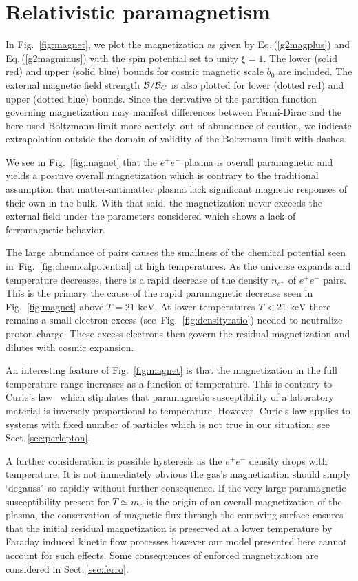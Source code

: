 \documentclass[aps,prd,floatfix,reprint]{revtex4-2}
\newcommand*{\keV}{\text{ keV}}
\newcommand{\req}[1]{Eq.\,(\ref{#1})}
\newcommand{\rf}[1]{Fig.~{\ref{#1}}}
\newcommand{\rsec}[1]{Sect.\,{\ref{#1}}}
\begin{document}
\section{Relativistic paramagnetism}
\label{sec:paramagnetism}
\noindent In \rf{fig:magnet}, we plot the magnetization as given by \req{g2magplus} and \req{g2magminus} with the spin potential set to unity $\xi=1$. The lower (solid red) and upper (solid blue) bounds for cosmic magnetic scale $b_{0}$ are included. The external magnetic field strength ${\cal B}/{\cal B}_{C}$ is also plotted for lower (dotted red) and upper (dotted blue) bounds. Since the derivative of the partition function governing magnetization may manifest differences between Fermi-Dirac and the here used Boltzmann limit more acutely, out of abundance of caution, we indicate extrapolation outside the domain of validity of the Boltzmann limit with dashes.

We see in \rf{fig:magnet} that the $e^{+}e^{-}$ plasma is overall paramagnetic and yields a positive overall magnetization which is contrary to the traditional assumption that matter-antimatter plasma lack significant magnetic responses of their own in the bulk. With that said, the magnetization never exceeds the external field under the parameters considered which shows a lack of ferromagnetic behavior. 

The large abundance of pairs causes the smallness of the chemical potential seen in~\rf{fig:chemicalpotential} at high temperatures. As the universe expands and temperature decreases, there is a rapid decrease of the density $n_{e^{\pm}}$ of $e^{+}e^{-}$ pairs. This is the primary the cause of the rapid paramagnetic decrease seen in \rf{fig:magnet} above $T=21\keV$. At lower temperatures $T<21\keV$ there remains a small electron excess (see~\rf{fig:densityratio}) needed to neutralize proton charge. These excess electrons then govern the residual magnetization and dilutes with cosmic expansion.

An interesting feature of \rf{fig:magnet} is that the magnetization in the full temperature range increases as a function of temperature. This is contrary to Curie's law~\cite{greiner2012thermodynamics} which stipulates that paramagnetic susceptibility of a laboratory material is inversely proportional to temperature. However, Curie's law applies to systems with fixed number of particles which is not true in our situation; see \rsec{sec:perlepton}.

A further consideration is possible hysteresis as the $e^{+}e^{-}$ density drops with temperature. It is not immediately obvious the gas's magnetization should simply \lq degauss\rq\ so rapidly without further consequence. If the very large paramagnetic susceptibility present for $T\simeq m_{e}$ is the origin of an overall magnetization of the plasma, the conservation of magnetic flux through the comoving surface ensures that the initial residual magnetization is preserved at a lower temperature by Faraday induced kinetic flow processes however our model presented here cannot account for such effects. Some consequences of enforced magnetization are considered in \rsec{sec:ferro}.
\end{document}
